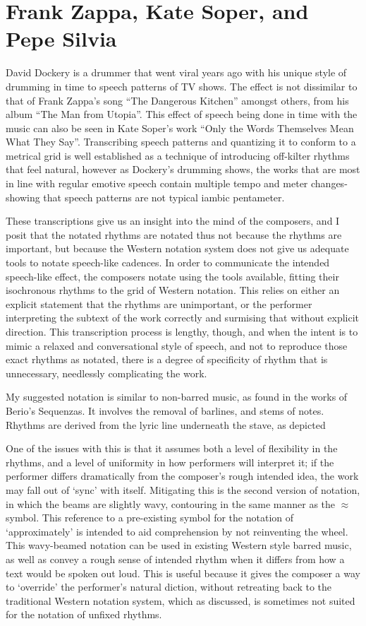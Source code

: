 
\section{Frank Zappa, Kate Soper, and Pepe Silvia}
David Dockery is a drummer that went viral years ago with his unique style of drumming in time to speech patterns of TV shows.\autocite[]{dockery YouTube}
The effect is not dissimilar to that of Frank Zappa's song ``The Dangerous Kitchen'' amongst others, from his album ``The Man from Utopia''.\autocite[]{zappa}
This effect of speech being done in time with the music can also be seen in Kate Soper's work ``Only the Words Themselves Mean What They Say''.\autocite[]{soper}
Transcribing speech patterns and quantizing it to conform to a metrical grid is well established as a technique of introducing off-kilter rhythms that feel natural, however as Dockery's drumming shows, the works that are most in line with regular emotive speech contain multiple tempo and meter changes- 
showing that speech patterns are not typical iambic pentameter.

These transcriptions give us an insight into the mind of the composers, and I posit that the notated rhythms are notated thus not because the rhythms are important, but because the Western notation system does not give us adequate tools to notate speech-like cadences. 
In order to communicate the intended speech-like effect, the composers notate using the tools available, fitting their isochronous rhythms to the grid of Western notation.
This relies on either an explicit statement that the rhythms are unimportant, or the performer interpreting the subtext of the work correctly and surmising that without explicit direction.
This transcription process is lengthy, though, and when the intent is to mimic a relaxed and conversational style of speech, and not to reproduce those exact rhythms as notated, there is a degree of specificity of rhythm that is unnecessary, needlessly complicating the work.

My suggested notation is similar to non-barred music, as found in the works of Berio's Sequenzas.
It involves the removal of barlines, and stems of notes. 
Rhythms are derived from the lyric line underneath the stave, as depicted 

One of the issues with this is that it assumes both a level of flexibility in the rhythms, and a level of uniformity in how performers will interpret it; if the performer differs dramatically from the composer's rough intended idea, the work may fall out of `sync' with itself.
Mitigating this is the second version of notation, in which the beams are slightly wavy, contouring in the same manner as the \(\approx{}\) symbol. 
This reference to a pre-existing symbol for the notation of `approximately' is intended to aid comprehension by not reinventing the wheel.
This wavy-beamed notation can be used in existing Western style barred music, as well as convey a rough sense of intended rhythm when it differs from how a text would be spoken out loud.
This is useful because it gives the composer a way to `override' the performer's natural diction, without retreating back to the traditional Western notation system, which as discussed, is sometimes not suited for the notation of unfixed rhythms.

